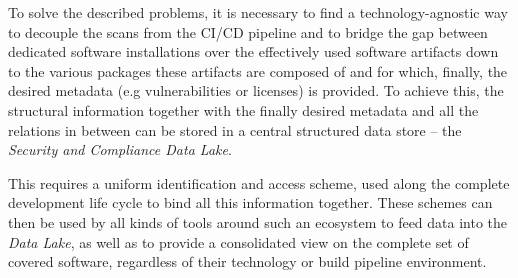 To solve the described problems, it is necessary to find a technology-agnostic way to decouple the scans from the CI/CD pipeline and to bridge the gap between dedicated software installations over the effectively used software artifacts down to the various packages these artifacts are composed of and for which, finally, the desired metadata (e.g vulnerabilities or licenses) is provided. To achieve this, the structural information together with the finally desired metadata and all the relations in between can be stored in a central structured data store -- the \emph{Security and Compliance Data Lake}.\par
This requires a uniform identification and access scheme, used along the complete development life cycle to bind all this information together. These schemes can then be used by all kinds of tools around such an ecosystem to feed data into the \emph{Data Lake}, as well as to provide a consolidated view on the complete set of covered software, regardless of their technology or build pipeline environment.

